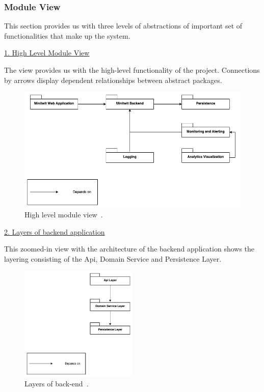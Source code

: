 \subsubsection*{Module View}

This section provides us with three levels of abstractions of important set of functionalities that make up the system.
\vspace{3mm}

\underline{1. High Level Module View}
\vspace{3mm}

The view provides us with the high-level functionality of the project. Connections by arrows display dependent relationships between abstract packages.

\begin{figure}[h!]
    \centering
    \includegraphics[width=\linewidth,height=\textheight,keepaspectratio]{images/architectural_views/minitwit_module_view_high_level.png}
    \caption{High level module view~\cite{moduleViewHighLevel}.}
    \label{fig:moduleview}
\end{figure}

\newpage

\underline{2. Layers of backend application}
\vspace{3mm}

This zoomed-in view with the architecture of the backend application shows the layering consisting of the Api, Domain Service and Persistence Layer.

\begin{figure}[h!]
    \centering
    \includegraphics[width=0.5\textwidth]{images/architectural_views/minitwit_module_view_backend_layers.png}
    \caption{Layers of back-end~\cite{moduleViewLayers}.}
    \label{fig:modulebackend}
\end{figure}

